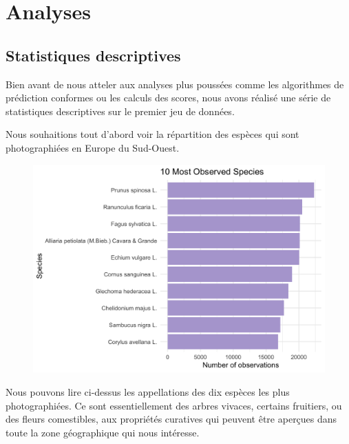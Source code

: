 \documentclass[a4paper,12pt]{article}
\begin{document}

\section{Analyses}


\subsection{Statistiques descriptives}

Bien avant de nous atteler aux analyses plus poussées comme les algorithmes de prédiction conformes ou les calculs des scores, nous avons réalisé une série de statistiques descriptives sur le premier jeu de données. 

\vspace{2.0cm}

Nous souhaitions tout d'abord voir la répartition des espèces qui sont photographiées en Europe du Sud-Ouest.

\begin{figure}[H]
  \centering
  \includegraphics[scale=0.3]{images/10_Most_Observed_Species.png}
  \label{fig1}
\end{figure}

Nous pouvons lire ci-dessus les appellations des dix espèces les plus photographiées. Ce sont essentiellement des arbres vivaces, certains fruitiers, ou des fleurs comestibles, aux propriétés curatives qui peuvent être aperçues dans toute la zone géographique qui nous intéresse. 
\end{document}
